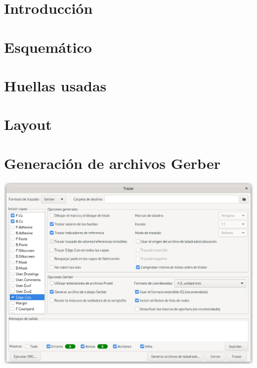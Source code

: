 \section{Introducción}

\section{Esquemático}



\section{Huellas usadas}



\section{Layout}



\section{Generación de archivos Gerber}

\includegraphics[width=\linewidth]{gerber-file-generation.png}

